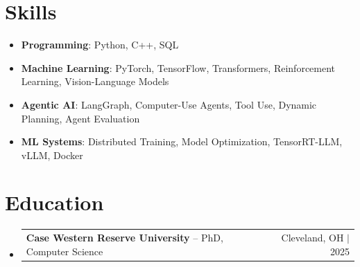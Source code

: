 \documentclass[letterpaper,13pt]{article}
\makeatletter
\newcommand{\resumeProjectHeading}[2]{
    \item
    \begin{tabular*}{\textwidth}{l@{\extracolsep{\fill}}r}
      \small#1 & #2 \\
    \end{tabular*}\vspace{-4pt}
}
\newcommand{\resumeSubHeadingListStart}{\begin{itemize}[leftmargin=0in, label={}]}
\newcommand{\resumeSubHeadingListEnd}{\end{itemize}}
\makeatother
\begin{document}
\section{Skills}
\vspace{0.02cm}
\begin{itemize}[leftmargin=0.15in, label={}, itemsep=2pt, topsep=1pt]
  \item \textbf{Programming}: Python, C++, SQL
  \item \textbf{Machine Learning}: PyTorch, TensorFlow, Transformers, Reinforcement Learning, Vision-Language Models
  \item \textbf{Agentic AI}: LangGraph, Computer-Use Agents, Tool Use, Dynamic Planning, Agent Evaluation
  \item \textbf{ML Systems}: Distributed Training, Model Optimization, TensorRT-LLM, vLLM, Docker
\end{itemize}
\vspace{0.02cm}

\section{Education}
\resumeSubHeadingListStart
  \resumeProjectHeading{\textbf{Case Western Reserve University} -- PhD, Computer Science}{Cleveland, OH $|$ 2025}
\resumeSubHeadingListEnd
\end{document}
